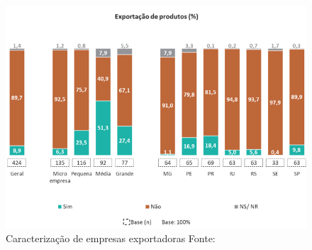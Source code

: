 \begin{figure}[h]
    \centering
    \includegraphics[scale=0.75]{Imagens/Exportacao_2.PNG}
    \caption{Caracterização de empresas exportadoras \newline
     Fonte: \cite{innovare}}
\end{figure}